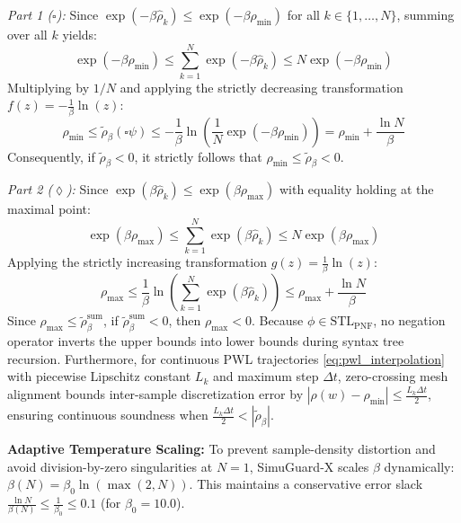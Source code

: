 \documentclass[journal]{IEEEtran}
\begin{document}
\begin{IEEEproof}
\textit{Part 1 ($\square$):} Since $\exp(-\beta \hat{\rho}_k) \le \exp(-\beta \rho_{\min})$ for all $k \in \{1,\dots,N\}$, summing over all $k$ yields:
\begin{equation*}
\exp(-\beta \rho_{\min}) \le \sum_{k=1}^N \exp(-\beta \hat{\rho}_k) \le N \exp(-\beta \rho_{\min})
\end{equation*}
Multiplying by $1/N$ and applying the strictly decreasing transformation $f(z) = -\frac{1}{\beta} \ln(z)$:
\begin{equation*}
\rho_{\min} \le \tilde{\rho}_\beta(\square \psi) \le -\frac{1}{\beta} \ln\left(\frac{1}{N} \exp(-\beta \rho_{\min})\right) = \rho_{\min} + \frac{\ln N}{\beta}
\end{equation*}
Consequently, if $\tilde{\rho}_\beta < 0$, it strictly follows that $\rho_{\min} \le \tilde{\rho}_\beta < 0$.

\textit{Part 2 ($\lozenge$):} Since $\exp(\beta \hat{\rho}_k) \le \exp(\beta \rho_{\max})$ with equality holding at the maximal point:
\begin{equation*}
\exp(\beta \rho_{\max}) \le \sum_{k=1}^N \exp(\beta \hat{\rho}_k) \le N \exp(\beta \rho_{\max})
\end{equation*}
Applying the strictly increasing transformation $g(z) = \frac{1}{\beta} \ln(z)$:
\begin{equation*}
\rho_{\max} \le \frac{1}{\beta} \ln\left(\sum_{k=1}^N \exp(\beta \hat{\rho}_k)\right) \le \rho_{\max} + \frac{\ln N}{\beta}
\end{equation*}
Since $\rho_{\max} \le \tilde{\rho}_\beta^{\text{sum}}$, if $\tilde{\rho}_\beta^{\text{sum}} < 0$, then $\rho_{\max} < 0$. Because $\phi \in \text{STL}_{\text{PNF}}$, no negation operator inverts the upper bounds into lower bounds during syntax tree recursion. Furthermore, for continuous PWL trajectories \eqref{eq:pwl_interpolation} with piecewise Lipschitz constant $L_k$ and maximum step $\Delta t$, zero-crossing mesh alignment bounds inter-sample discretization error by $|\rho(w) - \rho_{\min}| \le \frac{L_k \Delta t}{2}$, ensuring continuous soundness when $\frac{L_k \Delta t}{2} < |\tilde{\rho}_\beta|$.
\end{IEEEproof}

\noindent\textbf{Adaptive Temperature Scaling:} To prevent sample-density distortion and avoid division-by-zero singularities at $N=1$, SimuGuard-X scales $\beta$ dynamically: $\beta(N) = \beta_0 \ln(\max(2, N))$. This maintains a conservative error slack $\frac{\ln N}{\beta(N)} \le \frac{1}{\beta_0} \le 0.1$ (for $\beta_0 = 10.0$).
\end{document}

